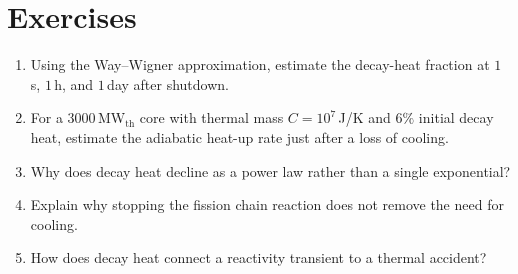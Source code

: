 \section*{Exercises}
\begin{enumerate}[leftmargin=*,itemsep=2pt]
\item Using the Way--Wigner approximation, estimate the decay-heat fraction at $1\,$s, $1\,$h, and $1\,$day after shutdown.
\item For a $3000\,$MW$_\text{th}$ core with thermal mass $C=10^7\,$J/K and $6\%$ initial decay heat, estimate the adiabatic heat-up rate just after a loss of cooling.
\item Why does decay heat decline as a power law rather than a single exponential?
\item Explain why stopping the fission chain reaction does not remove the need for cooling.
\item How does decay heat connect a reactivity transient to a thermal accident?
\end{enumerate}
